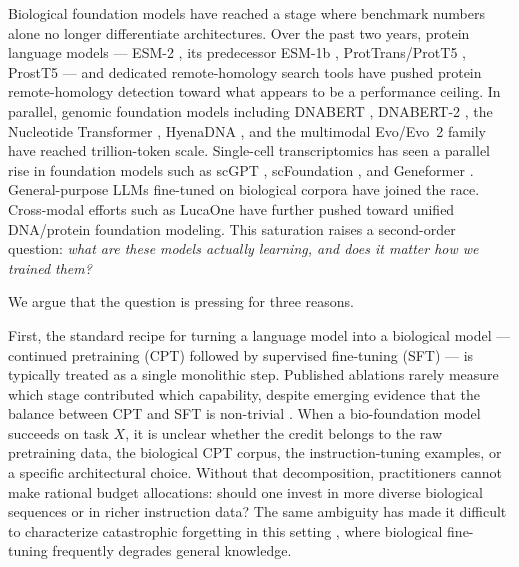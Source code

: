 \documentclass[11pt]{article}
\begin{document}
Biological foundation models have reached a stage where benchmark numbers alone no longer differentiate architectures. Over the past two years, protein language models --- ESM-2 \citep{lin2023evolutionary}, its predecessor ESM-1b \citep{rives2021biological}, ProtTrans/ProtT5 \citep{elnaggar2021prottrans}, ProstT5 \citep{heinzinger2024prostt5} --- and dedicated remote-homology search tools \citep{hamamsy2024protein, liu2024plmsearch, schutze2023prottranssearch} have pushed protein remote-homology detection toward what appears to be a performance ceiling. In parallel, genomic foundation models including DNABERT \citep{ji2021dnabert}, DNABERT-2 \citep{zhou2023dnabert2}, the Nucleotide Transformer \citep{dallatorre2023nucleotide}, HyenaDNA \citep{nguyen2023hyenadna}, and the multimodal Evo/Evo~2 family \citep{nguyen2024evo, brixi2026evo2} have reached trillion-token scale. Single-cell transcriptomics has seen a parallel rise in foundation models such as scGPT \citep{cui2024scgpt}, scFoundation \citep{hao2024scfoundation}, and Geneformer \citep{theodoris2023geneformer}. General-purpose LLMs fine-tuned on biological corpora \citep{wang2026biopaws, luo2022biogpt, bolton2024biomedlm, gu2021pubmedbert} have joined the race. Cross-modal efforts such as LucaOne \citep{he2024lucaone} have further pushed toward unified DNA/protein foundation modeling. This saturation raises a second-order question: \emph{what are these models actually learning, and does it matter how we trained them?}

We argue that the question is pressing for three reasons.

First, the standard recipe for turning a language model into a biological model --- continued pretraining (CPT) followed by supervised fine-tuning (SFT) --- is typically treated as a single monolithic step. Published ablations rarely measure which stage contributed which capability, despite emerging evidence that the balance between CPT and SFT is non-trivial \citep{ibrahim2024cpt, jindal2024balance, jiang2024instruction}. When a bio-foundation model succeeds on task $X$, it is unclear whether the credit belongs to the raw pretraining data, the biological CPT corpus, the instruction-tuning examples, or a specific architectural choice. Without that decomposition, practitioners cannot make rational budget allocations: should one invest in more diverse biological sequences or in richer instruction data? The same ambiguity has made it difficult to characterize catastrophic forgetting in this setting \citep{luo2023forgetting, huang2024sssr}, where biological fine-tuning frequently degrades general knowledge.
\end{document}
